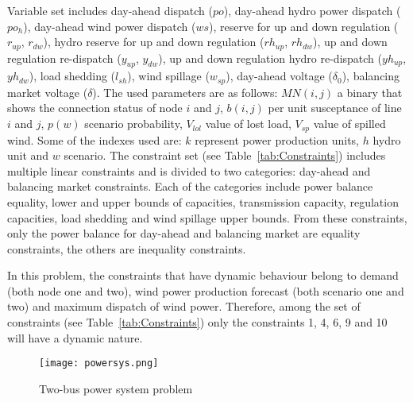 \documentclass[review]{elsarticle}
\begin{document}
Variable set includes day-ahead dispatch ($po$), day-ahead hydro power dispatch ($po_h$), day-ahead wind power dispatch ($ws$), reserve for up and down regulation ($r_{up}$, $r_{dw}$), hydro reserve for up and down regulation ($rh_{up}$, $rh_{dw}$), up and down regulation re-dispatch ($y_{up}$, $y_{dw}$), up and down regulation hydro re-dispatch ($yh_{up}$, $yh_{dw}$), load shedding ($l_{sh}$), wind spillage ($w_{sp}$), day-ahead voltage ($\delta_0$), balancing market voltage ($\delta$). The used parameters are as follows: $MN(i,j)$ a binary that shows the connection status of node $i$ and $j$, $b(i,j)$ per unit susceptance of line $i$ and $j$, $p(w)$ scenario probability, $V_{lol}$ value of lost load, $V_{sp}$ value of spilled wind. Some of the indexes used are: $k$ represent power production units, $h$ hydro unit and $w$ scenario.
The constraint set (see Table~\ref{tab:Constraints}) includes multiple linear constraints and is divided to two categories: day-ahead and balancing market constraints. Each of the categories include power balance equality, lower and upper bounds of capacities, transmission capacity, regulation capacities, load shedding and wind spillage upper bounds. From these constraints, only the power balance for day-ahead and balancing market are equality constraints, the others are inequality constraints.

In this problem, the constraints that have dynamic behaviour belong to demand (both node one and two), wind power production forecast (both scenario one and two) and maximum dispatch of wind power. Therefore, among the set of constraints (see Table~\ref{tab:Constraints}) only the constraints 1, 4, 6, 9 and 10 will have a dynamic nature.


  \begin{figure}[t]
        \centering          \texttt{[image: powersys.png]} 
        \caption[]
        {\small Two-bus power system problem}
         \label{fig:powersysp}
    \end{figure}
\end{document}
